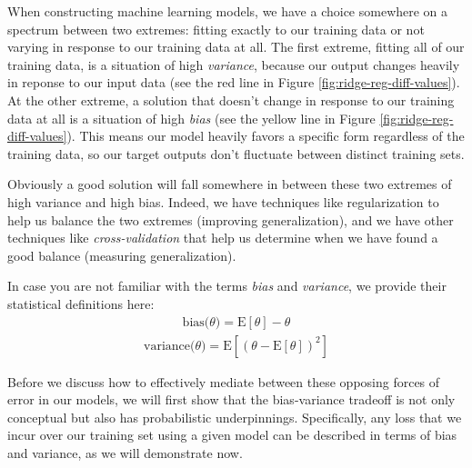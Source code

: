 \begin{definition}
    When constructing machine learning models, we have a choice somewhere on a spectrum between two extremes: fitting exactly to our training data or not varying in response to our training data at all. The first extreme, fitting all of our training data, is a situation of high \textit{variance}, because our output changes heavily in reponse to our input data (see the red line in Figure \ref{fig:ridge-reg-diff-values}). At the other extreme, a solution that doesn't change in response to our training data at all is a situation of high \textit{bias} (see the yellow line in Figure \ref{fig:ridge-reg-diff-values}). This means our model heavily favors a specific form regardless of the training data, so our target outputs don't fluctuate between distinct training sets.
\end{definition}

Obviously a good solution will fall somewhere in between these two extremes of high variance and high bias. Indeed, we have techniques like regularization to help us balance the two extremes (improving generalization), and we have other techniques like \textit{cross-validation} that help us determine when we have found a good balance (measuring generalization).

\begin{warning}
    In case you are not familiar with the terms \textit{bias} and \textit{variance}, we provide their statistical definitions here:
    \begin{align*}
        \text{bias($\theta$)} = \mathrm{E}[\theta] - \theta
    \end{align*}
    \begin{align*}
        \text{variance($\theta$)} = \mathrm{E}[(\theta - \mathrm{E}[\theta])^{2}]
    \end{align*}
\end{warning}

Before we discuss how to effectively mediate between these opposing forces of error in our models, we will first show that the bias-variance tradeoff is not only conceptual but also has probabilistic underpinnings. Specifically, any loss that we incur over our training set using a given model can be described in terms of bias and variance, as we will demonstrate now.


